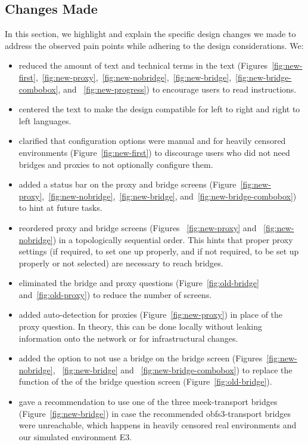 \documentclass[USenglish,oneside,twocolumn]{article}
\begin{document}
\subsection{Changes Made} 
In this section, we highlight and explain the specific design changes we made to address the observed pain points while adhering to the design considerations. We: \\

\begin{itemize}
\item{reduced the amount of text and technical terms in the text (Figures~\ref{fig:new-first},~\ref{fig:new-proxy},~\ref{fig:new-nobridge},~\ref{fig:new-bridge},~\ref{fig:new-bridge-combobox}, and ~\ref{fig:new-progress})  to encourage users to read instructions.} 
\item{centered the text to make the design compatible for left to right and right to left languages.}
\item{clarified that configuration options were manual and for heavily censored environments (Figure~\ref{fig:new-first}) to discourage users who did not need bridges and proxies to not optionally configure them.}
\item{added a status bar on the proxy and bridge screens (Figure~\ref{fig:new-proxy},~\ref{fig:new-nobridge},~\ref{fig:new-bridge}, and~\ref{fig:new-bridge-combobox}) to hint at future tasks.}
\item{reordered proxy and bridge screens (Figures ~\ref{fig:new-proxy} and ~\ref{fig:new-nobridge}) in a topologically sequential order. This hints that proper proxy settings (if required, to set one up properly, and if not required, to be set up properly or not selected) are necessary to reach bridges.}
\item{eliminated the bridge and proxy questions (Figure~\ref{fig:old-bridge} and~\ref{fig:old-proxy}) to reduce the number of screens.}
\item{added auto-detection for proxies (Figure~\ref{fig:new-proxy}) in place of the proxy question. In theory, this can be done locally without leaking information onto the network or for infrastructural changes.}
\item{added the option to not use a bridge on the bridge screen (Figures~\ref{fig:new-nobridge}, ~\ref{fig:new-bridge} and ~\ref{fig:new-bridge-combobox}) to replace the function of the of the bridge question screen (Figure~\ref{fig:old-bridge}).}
\item{gave a recommendation to use one of the three meek-transport bridges (Figure~\ref{fig:new-bridge}) in case the recommended obfs3-transport bridges were unreachable, which happens in heavily censored real environments and our simulated environment E3.}

\end{itemize}
\end{document}
